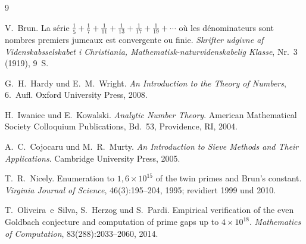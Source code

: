 \documentclass[12pt,a4paper]{amsart}
\theoremstyle{definition}
\begin{document}
\begin{thebibliography}{9}

V.~Brun.
\newblock La s{\'e}rie $\frac{1}{5}+\frac{1}{7}+\frac{1}{11}+\frac{1}{13}+\frac{1}{17}+\frac{1}{19}+\cdots$
  o\`u les d{\'e}nominateurs sont nombres premiers jumeaux est convergente ou finie.
\newblock \emph{Skrifter udgivne af Videnskabsselskabet i Christiania, Mathematisk-naturvidenskabelig Klasse},
  Nr.~3 (1919), 9~S.

G.~H.~Hardy und E.~M.~Wright.
\newblock \emph{An Introduction to the Theory of Numbers}, 6.~Aufl.
\newblock Oxford University Press, 2008.

H.~Iwaniec und E.~Kowalski.
\newblock \emph{Analytic Number Theory}.
\newblock American Mathematical Society Colloquium Publications, Bd.~53,
  Providence, RI, 2004.

A.~C.~Cojocaru und M.~R.~Murty.
\newblock \emph{An Introduction to Sieve Methods and Their Applications}.
\newblock Cambridge University Press, 2005.

T.~R.~Nicely.
\newblock Enumeration to $1{,}6 \times 10^{15}$ of the twin primes and Brun's constant.
\newblock \emph{Virginia Journal of Science}, 46(3):195--204, 1995; revidiert 1999 und 2010.

T.~Oliveira~e~Silva, S.~Herzog und S.~Pardi.
\newblock Empirical verification of the even Goldbach conjecture and computation
  of prime gaps up to $4 \times 10^{18}$.
\newblock \emph{Mathematics of Computation}, 83(288):2033--2060, 2014.

\end{thebibliography}
\end{document}
